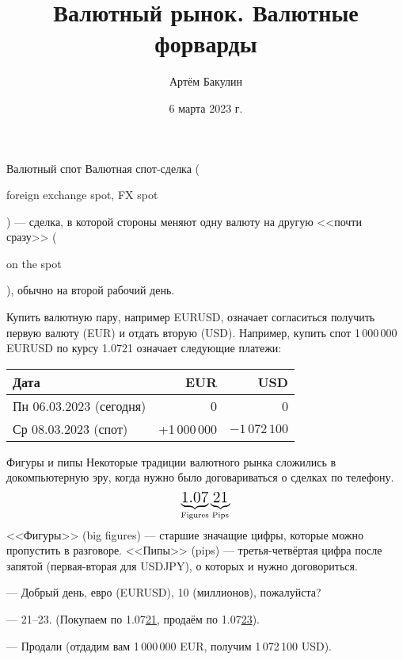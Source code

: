 \documentclass{beamer}
\title{Валютный рынок. Валютные форварды}
\author{Артём Бакулин}
\date{6 марта 2023 г.}
\newcommand{\en}[1]{\begin{otherlanguage}{english}#1\end{otherlanguage}}
\begin{document}
\begin{frame}
\titlepage
\end{frame}



\begin{frame}{Валютный спот}
\justify
\alert{Валютная спот-сделка} (\en{foreign exchange spot, FX spot}) --- сделка, в которой стороны меняют одну валюту на другую <<почти сразу>> (\en{on the spot}), обычно на второй рабочий день.

\justify
Купить валютную пару, например EURUSD, означает согласиться получить первую валюту (EUR) и отдать вторую (USD). Например, купить спот 1\,000\,000 EURUSD по курсу 1.0721 означает следующие платежи:

\justify
\centering
\begin{tabular}{l|r|r}
Дата                          & EUR & USD \\ \hline
Пн 06.03.2023 (сегодня)  & 0   & 0   \\
Ср 08.03.2023 (спот)     & +1\,000\,000 & $-1\,072\,100$
\end{tabular}
\end{frame}



\begin{frame}{Фигуры и пипы}
\justify
Некоторые традиции валютного рынка сложились в докомпьютерную эру, когда нужно
было договариваться о сделках по телефону.
\begin{align*}
\underbrace{\text{\Large 1.07}}_{\text{Figures}}\underbrace{\text{\Large 21}}_{\text{Pips}}
\end{align*}
\justify
<<Фигуры>> (big figures) ---  старшие значащие цифры, которые можно пропустить в 
разговоре. <<Пипы>> (pips) --- третья-четвёртая цифра после запятой (первая-вторая 
для USDJPY), о которых и нужно договориться.

\justify
--- Добрый день, евро (EURUSD), 10 (миллионов), пожалуйста?

--- 21--23. (Покупаем по 1.07\underline{21}, продаём по 1.07\underline{23}).

--- Продали (отдадим вам 1\,000\,000 EUR, получим 1\,072\,100 USD).
\end{frame}
\end{document}
